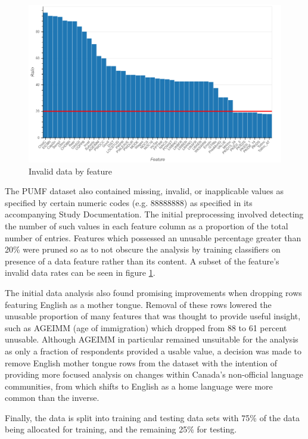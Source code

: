 \documentclass[10pt, conference, compsocconf]{IEEEtran}
\begin{document}
\begin{figure}
  \includegraphics[scale=0.25]{invalid_data_by_feature}
  \centering
  \caption{Invalid data by feature}
  \label{fig:invalid_data}
\end{figure}

The PUMF dataset also contained missing, invalid, or inapplicable values as specified by certain numeric codes (e.g.  88888888) as specified in its accompanying Study Documentation.  The initial preprocessing involved detecting the number of such values in each feature column as a proportion of the total number of entries.  Features which possessed an unusable percentage greater than 20\% were pruned so as to not obscure the analysis by training classifiers on presence of a data feature rather than its content. A subset of the feature's invalid data rates can be seen in figure \ref{fig:invalid_data}.


The initial data analysis also found promising improvements when dropping rows featuring English as a mother tongue.  Removal of these rows lowered the unusable proportion of many features that was thought to provide useful insight, such as AGEIMM (age of immigration) which dropped from 88 to 61 percent unusable.  Although AGEIMM in particular remained unsuitable for the analysis as only a fraction of respondents provided a usable value, a decision was made to remove English mother tongue rows from the dataset with the intention of providing more focused analysis on changes within Canada's non-official language communities, from which shifts to English as a home language were more common than the inverse.

Finally, the data is split into training and testing data sets with 75\% of the data being allocated for training, and the remaining 25\% for testing.
\end{document}
